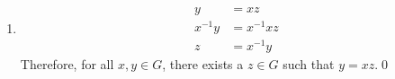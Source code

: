 \begin{enumerate}[label={\Alph*.},font={\bfseries}]
\begin{enumerate}[label={\arabic*},font={\bfseries}]
    As shown in the table, there does not exist an $x \in G$ such that $x = y^2$ for $y \in \Set{\mathbf{A}, \mathbf{C}, \mathbf{K}}$. \\
    Therefore $\neg\left(\forall x \in G,\ \exists y \in G\left( x = y^2 \right)\right)$.\qed
  \item
    \begin{align*}
      y &= xz \\
      x^{-1}y &= x^{-1}xz \\
      z &= x^{-1}y
    \end{align*}
    Therefore, for all $x,y \in G$, there exists a $z \in G$ such that $y = xz$.\qed
  \end{enumerate}
\end{enumerate}
